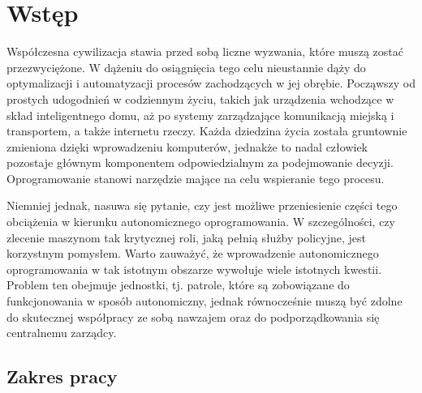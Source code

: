 \chapter{Wstęp}

\par Współczesna cywilizacja stawia przed sobą liczne wyzwania, które muszą zostać przezwyciężone. W dążeniu do osiągnięcia tego celu nieustannie dąży do optymalizacji i automatyzacji procesów zachodzących w jej obrębie. Począwszy od prostych udogodnień w codziennym życiu, takich jak urządzenia wchodzące w skład inteligentnego domu, aż po systemy zarządzające komunikacją miejską i transportem, a także internetu rzeczy. Każda dziedzina życia została gruntownie zmieniona dzięki wprowadzeniu komputerów, jednakże to nadal człowiek pozostaje głównym komponentem odpowiedzialnym za podejmowanie decyzji. Oprogramowanie stanowi narzędzie mające na celu wspieranie tego procesu.

\par Niemniej jednak, nasuwa się pytanie, czy jest możliwe przeniesienie części tego obciążenia w kierunku autonomicznego oprogramowania. W szczególności, czy zlecenie maszynom tak krytycznej roli, jaką pełnią służby policyjne, jest korzystnym pomysłem. Warto zauważyć, że wprowadzenie autonomicznego oprogramowania w tak istotnym obszarze wywołuje wiele istotnych kwestii. Problem ten obejmuje jednostki, tj. patrole, które są zobowiązane do funkcjonowania w sposób autonomiczny, jednak równocześnie muszą być zdolne do skutecznej współpracy ze sobą nawzajem oraz do podporządkowania się centralnemu zarządcy.

\section{Zakres pracy}
\label{sec:zakresPracy}

